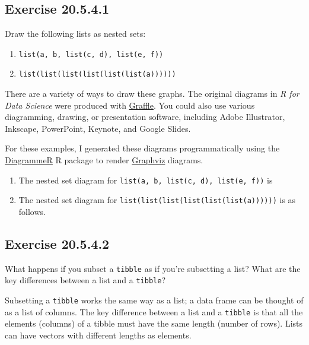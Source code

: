 \documentclass[]{book}
\providecommand{\tightlist}{%
  \setlength{\itemsep}{0pt}\setlength{\parskip}{0pt}}
\theoremstyle{plain}
\theoremstyle{remark}
\begin{document}
\hypertarget{exercise-20.5.4.1}{%
\subsection*{\texorpdfstring{Exercise {20.5.4.1}}{Exercise 20.5.4.1}}\label{exercise-20.5.4.1}}

Draw the following lists as nested sets:

\begin{enumerate}
\def\labelenumi{\arabic{enumi}.}
\tightlist
\item
  \texttt{list(a,\ b,\ list(c,\ d),\ list(e,\ f))}
\item
  \texttt{list(list(list(list(list(list(a))))))}
\end{enumerate}

There are a variety of ways to draw these graphs.
The original diagrams in \emph{R for Data Science} were produced with \href{https://www.omnigroup.com/omnigraffle}{Graffle}.
You could also use various diagramming, drawing, or presentation software, including Adobe Illustrator, Inkscape, PowerPoint, Keynote, and Google Slides.

For these examples, I generated these diagrams programmatically using the
\href{http://rich-iannone.github.io/DiagrammeR/graphviz_and_mermaid.html}{DiagrammeR} R package to render \href{https://www.graphviz.org/}{Graphviz} diagrams.

\begin{enumerate}
\def\labelenumi{\arabic{enumi}.}
\item
  The nested set diagram for
  \texttt{list(a,\ b,\ list(c,\ d),\ list(e,\ f))}
  is
\item
  The nested set diagram for
  \texttt{list(list(list(list(list(list(a))))))}
  is as follows.
\end{enumerate}

\hypertarget{exercise-20.5.4.2}{%
\subsection*{\texorpdfstring{Exercise {20.5.4.2}}{Exercise 20.5.4.2}}\label{exercise-20.5.4.2}}

What happens if you subset a \texttt{tibble} as if you're subsetting a list? What are the key differences between a list and a \texttt{tibble}?

Subsetting a \texttt{tibble} works the same way as a list; a data frame can be thought of as a list of columns.
The key difference between a list and a \texttt{tibble} is that all the elements (columns) of a tibble must have the same length (number of rows).
Lists can have vectors with different lengths as elements.
\end{document}
